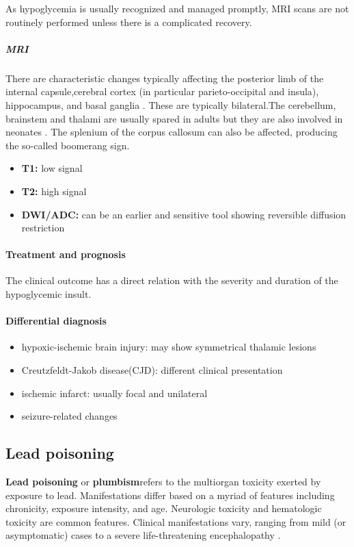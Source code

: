 As hypoglycemia is usually recognized and managed promptly, MRI scans are not routinely performed unless there is a complicated recovery.

\subparagraph{MRI}

There are characteristic changes typically affecting the posterior limb of the internal capsule,cerebral cortex (in particular parieto-occipital and insula), hippocampus, and basal ganglia . These are typically bilateral.The cerebellum, brainstem and thalami are usually spared in adults but they are also involved in neonates . The splenium of the corpus callosum can also be affected, producing the so-called boomerang sign.

\begin{itemize}
	\item
	\textbf{T1:} low signal
	\item
	\textbf{T2:} high signal
	\item
	\textbf{DWI/ADC:} can be an earlier and sensitive tool showing reversible diffusion restriction 
\end{itemize}


\paragraph{Treatment and prognosis}

The clinical outcome has a direct relation with the severity and duration of the hypoglycemic insult.


\paragraph{Differential diagnosis}

\begin{itemize}
	\item
	hypoxic-ischemic brain injury: may show symmetrical thalamic lesions 
	\item
	Creutzfeldt-Jakob disease(CJD): different clinical presentation
	\item
	ischemic infarct: usually focal and unilateral
	\item
	seizure-related changes
\end{itemize}
\subsection{Lead poisoning}

\textbf{Lead poisoning} or \textbf{plumbism}refers to the multiorgan toxicity exerted by exposure to lead. Manifestations differ based on a myriad of features including chronicity, exposure intensity, and age. Neurologic toxicity and hematologic toxicity are common features. Clinical manifestations vary, ranging from mild (or asymptomatic) cases to a severe life-threatening encephalopathy .

